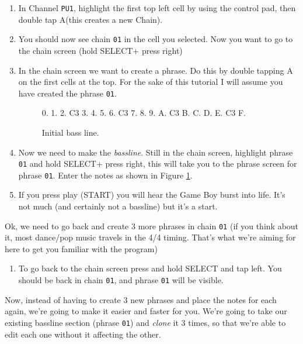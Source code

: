 \documentclass[]{article}
\newcommand{\buttonStyle}[1]{\textsf{#1}\xspace}
\newcommand{\bA}{\buttonStyle{A}}
\newcommand{\bStart}{\buttonStyle{{START}}}
\newcommand{\bSelect}{\buttonStyle{{SELECT}}}
\newcommand{\bRight}{\buttonStyle{right}}
\newcommand{\bLeft}{\buttonStyle{left}}
\newcommand{\nb}[1]{\texttt{#1}\xspace}
\begin{document}
\begin{enumerate}

\item In Channel \nb{PU1}, highlight the first top left cell by using the control pad, then double tap \bA (this creates a new Chain).

\item You should now see chain \nb{01} in the cell you selected. Now you want to go to the chain screen (hold \bSelect + press \bRight)

\item In the chain screen we want to create a phrase. Do this by double tapping \bA on the first cells at the top. For the sake of this tutorial I will assume you have created the phrase \nb{01}.

\begin{figure}
\begin{notes}
0.
1.
2. C3
3.
4.
5.
6. C3
7.
8.
9.
A. C3
B.
C.
D.
E. C3
F.
\end{notes}	
\caption{Initial bass line.}\label{bassline}
\end{figure}

\item Now we need to make the \textit{bassline}. Still in the chain screen, highlight phrase \nb{01} and hold \bSelect + press \bRight, this will take you to the phrase screen for phrase \nb{01}. Enter the notes as shown in Figure \ref{bassline}.


\item If you press play (\bStart) you will hear the Game Boy burst into life. It's not much (and certainly not a bassline) but it's a start.

\end{enumerate}

Ok, we need to go back and create 3 more phrases in chain \nb{01} (if you think about it, most dance/pop music travels in the 4/4 timing. That's what we're aiming for here to get you familiar with the program) %

\begin{enumerate}[resume]


\item To go back to the chain screen press and hold \bSelect and tap \bLeft. You should be back in chain \nb{01}, and phrase \nb{01} will be visible.

\end{enumerate}

Now, instead of having to create 3 new phrases and place the notes for each again, we're going to make it easier and faster for you. We're going to take our existing bassline section (phrase \nb{01}) and \textit{clone} it 3 times, so that we're able to edit each one without it affecting the other. 
\end{document}
